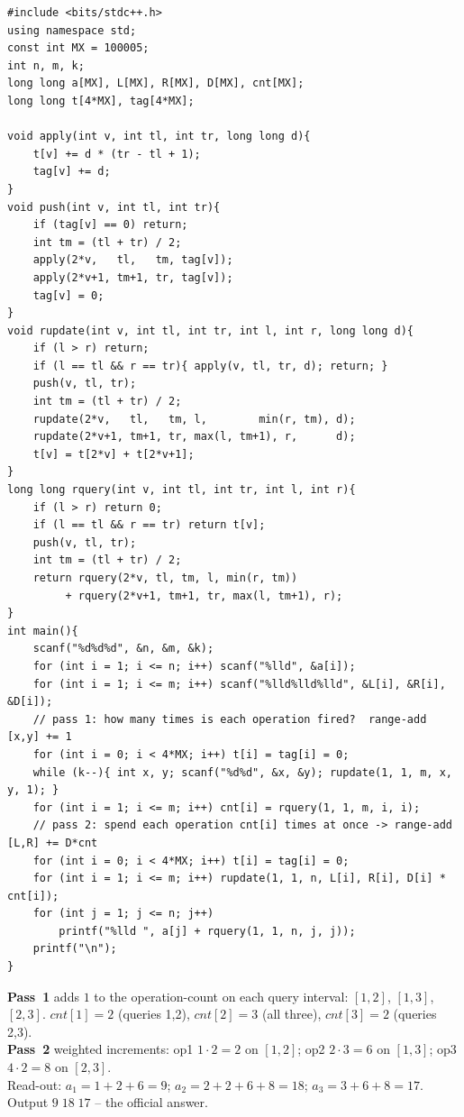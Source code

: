 \begin{lstlisting}[caption={CF 295A full solution: two stacked lazy range-add passes (long long)}, label={lst:c15-295-soln}]
#include <bits/stdc++.h>
using namespace std;
const int MX = 100005;
int n, m, k;
long long a[MX], L[MX], R[MX], D[MX], cnt[MX];
long long t[4*MX], tag[4*MX];

void apply(int v, int tl, int tr, long long d){
    t[v] += d * (tr - tl + 1);
    tag[v] += d;
}
void push(int v, int tl, int tr){
    if (tag[v] == 0) return;
    int tm = (tl + tr) / 2;
    apply(2*v,   tl,   tm, tag[v]);
    apply(2*v+1, tm+1, tr, tag[v]);
    tag[v] = 0;
}
void rupdate(int v, int tl, int tr, int l, int r, long long d){
    if (l > r) return;
    if (l == tl && r == tr){ apply(v, tl, tr, d); return; }
    push(v, tl, tr);
    int tm = (tl + tr) / 2;
    rupdate(2*v,   tl,   tm, l,        min(r, tm), d);
    rupdate(2*v+1, tm+1, tr, max(l, tm+1), r,      d);
    t[v] = t[2*v] + t[2*v+1];
}
long long rquery(int v, int tl, int tr, int l, int r){
    if (l > r) return 0;
    if (l == tl && r == tr) return t[v];
    push(v, tl, tr);
    int tm = (tl + tr) / 2;
    return rquery(2*v, tl, tm, l, min(r, tm))
         + rquery(2*v+1, tm+1, tr, max(l, tm+1), r);
}
int main(){
    scanf("%d%d%d", &n, &m, &k);
    for (int i = 1; i <= n; i++) scanf("%lld", &a[i]);
    for (int i = 1; i <= m; i++) scanf("%lld%lld%lld", &L[i], &R[i], &D[i]);
    // pass 1: how many times is each operation fired?  range-add [x,y] += 1
    for (int i = 0; i < 4*MX; i++) t[i] = tag[i] = 0;
    while (k--){ int x, y; scanf("%d%d", &x, &y); rupdate(1, 1, m, x, y, 1); }
    for (int i = 1; i <= m; i++) cnt[i] = rquery(1, 1, m, i, i);
    // pass 2: spend each operation cnt[i] times at once -> range-add [L,R] += D*cnt
    for (int i = 0; i < 4*MX; i++) t[i] = tag[i] = 0;
    for (int i = 1; i <= m; i++) rupdate(1, 1, n, L[i], R[i], D[i] * cnt[i]);
    for (int j = 1; j <= n; j++)
        printf("%lld ", a[j] + rquery(1, 1, n, j, j));
    printf("\n");
}
\end{lstlisting}

\begin{tracebox}[CF 295A: \(a=(1,2,3)\); ops \((1,2,1),(1,3,2),(2,3,4)\); queries \((1,2),(1,3),(2,3)\)]
\textbf{Pass~1} adds \(1\) to the operation-count on each query interval: \([1,2]\), \([1,3]\), \([2,3]\).  \(\mathit{cnt}[1]=2\) (queries 1,2), \(\mathit{cnt}[2]=3\) (all three), \(\mathit{cnt}[3]=2\) (queries 2,3).\\
\textbf{Pass~2} weighted increments: op1 \(1\cdot2=2\) on \([1,2]\); op2 \(2\cdot3=6\) on \([1,3]\); op3 \(4\cdot2=8\) on \([2,3]\).\\
Read-out: \(a_1=1+2+6=9\); \(a_2=2+2+6+8=18\); \(a_3=3+6+8=17\).  Output \(\boxed{9\;18\;17}\) -- the official answer.
\end{tracebox}

